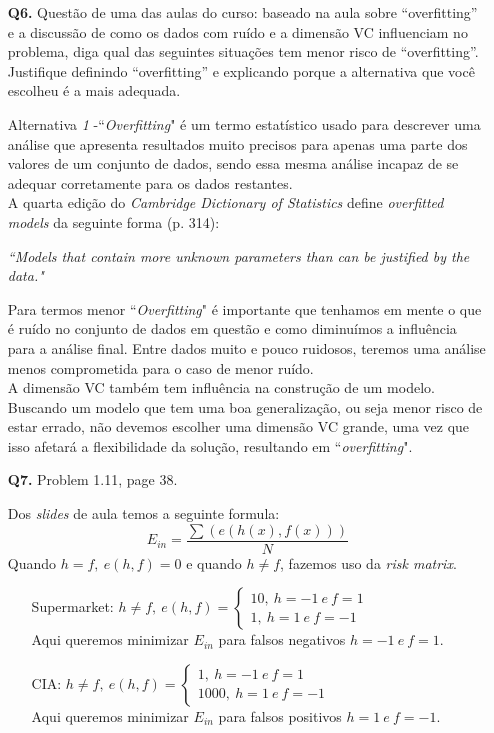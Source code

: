 \documentclass[12pt]{article}
\begin{document}
\begin{enumerate}
\item [\textbf{Q6.}] Questão de uma das aulas do curso: baseado na aula sobre ``overfitting'' e a discussão de como os dados com ruído e a dimensão VC influenciam no problema, diga qual das seguintes situações tem menor risco de ``overfitting''. Justifique definindo ``overfitting'' e explicando porque a alternativa que você escolheu
  é a mais adequada.
	\begin{addmargin}[1em]{2em}%
		Alternativa \textit{1} -``\textit{Overfitting}" é um termo estatístico usado para descrever uma análise que apresenta resultados muito precisos para apenas uma parte dos valores de um conjunto de dados, sendo essa mesma análise incapaz de se adequar corretamente para os dados restantes.\\
		A quarta edição do \textit{Cambridge Dictionary of Statistics} define \textit{overfitted models} da seguinte forma (p. 314):
			\begin{addmargin}[1em]{2em}%
				\textit{``Models that contain more unknown parameters than can be justified by the data."}
			\end{addmargin}
		Para termos menor ``\textit{Overfitting}" é importante que tenhamos em mente o que é ruído no conjunto de dados em questão e como diminuímos a influência para a análise final. Entre dados muito e pouco ruidosos, teremos uma análise menos comprometida para o caso de menor ruído.\\
		A dimensão VC também tem influência na construção de um modelo. Buscando um modelo que tem uma boa generalização, ou seja menor risco de estar errado, não devemos escolher uma dimensão VC grande, uma vez que isso afetará a flexibilidade da solução, resultando em ``\textit{overfitting}".
	\end{addmargin}

\item [\textbf{Q7.}] Problem 1.11, page 38.
	\begin{addmargin}[1em]{2em}%
		Dos \textit{slides} de aula temos a seguinte formula: \[E_{in} = \frac{\sum( e( h(x) , f(x) ) )}{N}\]
		Quando $h = f,\ e(h,f) = 0$ e quando $h \neq f$, fazemos uso da \textit{risk matrix}.
		\begin{itemize}
			\item[Supermarket:] $h \neq f,\ e(h,f) = \left\{\begin{array}{l}10,\ h = -1\ e\ f = 1\\1,\ h = 1\ e\ f = -1\end{array}\right.$\\
			Aqui queremos minimizar $E_{in}$ para falsos negativos $h = -1\ e\ f = 1$.
			\item[CIA:] $h \neq f,\ e(h,f) = \left\{\begin{array}{l}1,\ h = -1\ e\ f = 1\\1000,\ h = 1\ e\ f = -1\end{array}\right.$\\
			Aqui queremos minimizar $E_{in}$ para falsos positivos $h = 1\ e\ f = -1$.
		\end{itemize}
	\end{addmargin}


\end{enumerate}
\end{document}
